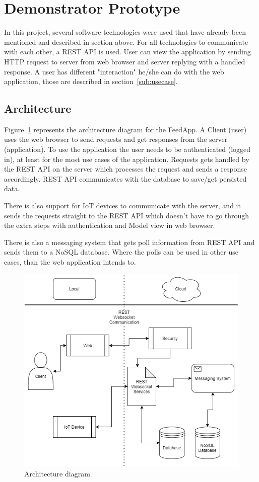 \section{Demonstrator Prototype}
\label{sec:design}

In this project, several software technologies were used that have already been mentioned and described in section above. For all technologies to communicate with each other, a REST API is used. User can view the application by sending HTTP request to server from web browser and server replying with a handled response. A user has different "interaction" he/she can do with the web application, those are described in section~\ref{sub:usecase}.

\subsection{Architecture}
\label{sub:architeure}
Figure~\ref{fig:archdiagram} represents the architecture diagram for the FeedApp.
A Client (user) uses the web browser to send requests and get responses from the server (application). To use the application the user needs to be authenticated (logged in), at least for the most use cases of the application. Requests gets handled by the REST API on the server which processes the request and sends a response accordingly. REST API communicates with the database to save/get persisted data.

There is also support for IoT devices to communicate with the server, and it sends the requests straight to the REST API which doesn't have to go through the extra steps with authentication and Model view in web browser.

There is also a messaging system that gets poll information from REST API and sends them to a NoSQL database. Where the polls can be used in other use cases, than the web application intends to.
\begin{figure}[H]
  \centering
  \includegraphics[scale=0.45]{figs/archdiagram.png}
  \caption[scale=0.5]{Architecture diagram.}
  \label{fig:archdiagram}
\end{figure}

